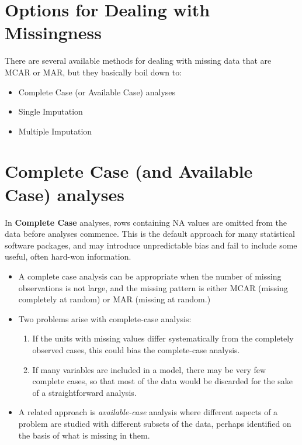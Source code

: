 \documentclass[]{book}
\providecommand{\tightlist}{%
  \setlength{\itemsep}{0pt}\setlength{\parskip}{0pt}}
\theoremstyle{definition}
\theoremstyle{definition}
\theoremstyle{definition}
\theoremstyle{remark}
\begin{document}
\section{Options for Dealing with
Missingness}\label{options-for-dealing-with-missingness}

There are several available methods for dealing with missing data that
are MCAR or MAR, but they basically boil down to:

\begin{itemize}
\tightlist
\item
  Complete Case (or Available Case) analyses
\item
  Single Imputation
\item
  Multiple Imputation
\end{itemize}

\section{Complete Case (and Available Case)
analyses}\label{complete-case-and-available-case-analyses}

In \textbf{Complete Case} analyses, rows containing NA values are
omitted from the data before analyses commence. This is the default
approach for many statistical software packages, and may introduce
unpredictable bias and fail to include some useful, often hard-won
information.

\begin{itemize}
\tightlist
\item
  A complete case analysis can be appropriate when the number of missing
  observations is not large, and the missing pattern is either MCAR
  (missing completely at random) or MAR (missing at random.)
\item
  Two problems arise with complete-case analysis:

  \begin{enumerate}
  \def\labelenumi{\arabic{enumi}.}
  \tightlist
  \item
    If the units with missing values differ systematically from the
    completely observed cases, this could bias the complete-case
    analysis.
  \item
    If many variables are included in a model, there may be very few
    complete cases, so that most of the data would be discarded for the
    sake of a straightforward analysis.
  \end{enumerate}
\item
  A related approach is \emph{available-case} analysis where different
  aspects of a problem are studied with different subsets of the data,
  perhaps identified on the basis of what is missing in them.
\end{itemize}
\end{document}
